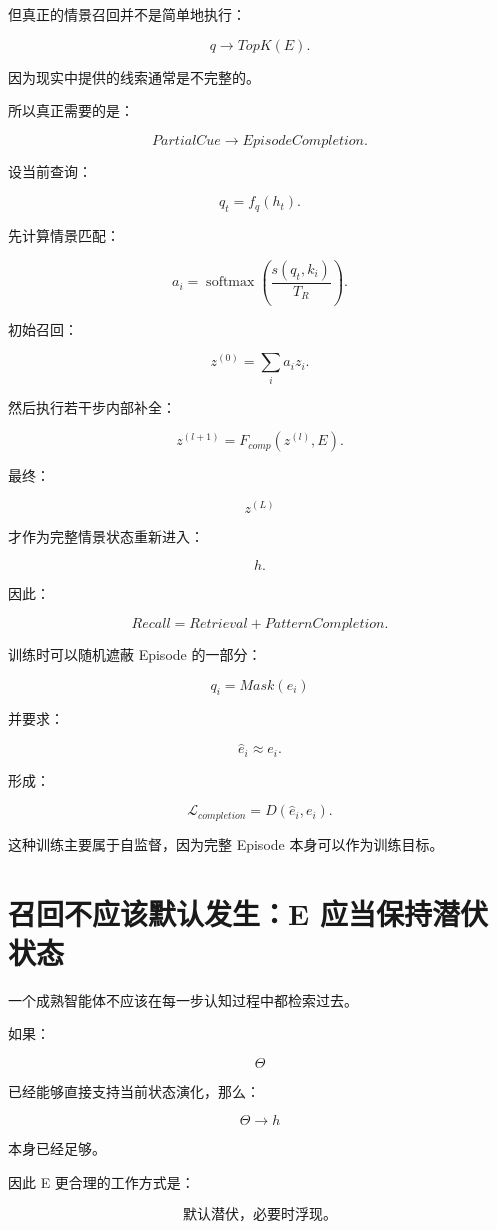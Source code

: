 但真正的情景召回并不是简单地执行：

\[
q
\rightarrow
TopK(E).
\]

因为现实中提供的线索通常是不完整的。

所以真正需要的是：

\[
\boxed{
PartialCue
\rightarrow
EpisodeCompletion.
}
\]

设当前查询：

\[
q_t=f_q(h_t).
\]

先计算情景匹配：

\[
a_i
=
\operatorname{softmax}
\left(
\frac{s(q_t,k_i)}
{T_R}
\right).
\]

初始召回：

\[
z^{(0)}
=
\sum_i a_iz_i.
\]

然后执行若干步内部补全：

\[
\boxed{
z^{(l+1)}
=
F_{comp}
\left(
z^{(l)},
E
\right).
}
\]

最终：

\[
z^{(L)}
\]

才作为完整情景状态重新进入：

\[
h.
\]

因此：

\[
\boxed{
Recall
=
Retrieval
+
PatternCompletion.
}
\]

训练时可以随机遮蔽 Episode 的一部分：

\[
q_i=
Mask(e_i)
\]

并要求：

\[
\hat e_i
\approx e_i.
\]

形成：

\[
\boxed{
\mathcal L_{completion}
=
D(
\hat e_i,
e_i
).
}
\]

这种训练主要属于自监督，因为完整 Episode 本身可以作为训练目标。


\section{召回不应该默认发生：E 应当保持潜伏状态}

一个成熟智能体不应该在每一步认知过程中都检索过去。

如果：

\[
\Theta
\]

已经能够直接支持当前状态演化，那么：

\[
\Theta\rightarrow h
\]

本身已经足够。

因此 E 更合理的工作方式是：

\[
\boxed{
\text{默认潜伏，必要时浮现。}
}
\]

